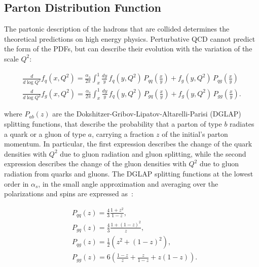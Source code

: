\subsection{Parton Distribution Function}
    \label{subsec:PDF_proton}

The partonic description of the hadrons that are collided determines the theoretical predictions on high energy physics.
Perturbative QCD cannot predict the form of the PDFs, but can describe their evolution with the variation of the scale $Q^2$:

\begin{equation}
\begin{split}
\frac{d}{d\log{Q^2}}f_{q}(x, Q^2) = \frac{\alpha_s}{2\pi}\int_{x}^{1}{\frac{dy}{y}\,f_{q}(y, Q^2)\,P_{qq}\left(\frac{x}{y}\right) + f_{g}(y, Q^2)\,P_{qg}\left(\frac{x}{y}\right)} \\
\frac{d}{d\log{Q^2}}f_{g}(x, Q^2) = \frac{\alpha_s}{2\pi}\int_{x}^{1}{\frac{dy}{y}\,f_{q}(y, Q^2)\,P_{gq}\left(\frac{x}{y}\right) + f_{g}(y, Q^2)\,P_{gg}\left(\frac{x}{y}\right)}.
\end{split}
\label{eq:EvolutionPDF}
\end{equation}

\noindent where $P_{ab}(z)$ are the Dokshitzer-Gribov-Lipatov-Altarelli-Parisi (DGLAP) splitting functions, that describe the probability that a parton of type $b$ radiates a quark or a gluon of type $a$, carrying a fraction $z$ of the initial's parton momentum.
In particular, the first expression describes the change of the quark densities with $Q^2$ due to gluon radiation and gluon splitting, while the second expression describes the change of the gluon densities with $Q^2$ due to gluon radiation from quarks and gluons.
The DGLAP splitting functions at the lowest order in $\alpha_s$, in the small angle approximation and averaging over the polarizations and spins are expressed as~\cite{Halzen}:

\begin{equation}
\begin{split}
&P_{qq}(z) = \frac{4}{3}\frac{1+z^2}{1-z}, \\
&P_{gq}(z) = \frac{4}{3}\frac{1+(1-z)^2}{z}, \\
&P_{qg}(z) = \frac{1}{2}\left(z^2+(1-z)^2\right), \\
&P_{gg}(z) = 6\left(\frac{1-z}{z} + \frac{z}{1-z} + z(1-z)\right).
\end{split}
\label{eq:DGLAP}
\end{equation}


